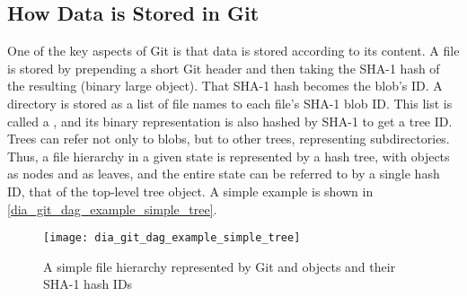





%

\subsection{How Data is Stored in Git}

One of the key aspects of Git is that data is stored according to its content. A
file is stored by prepending a short Git header and then taking the SHA-1 hash
of the resulting  (binary large object). That SHA-1 hash becomes
the blob's ID. A directory is stored as a list of file names to each file's
SHA-1 blob ID. This list is called a , and its binary
representation is also hashed by SHA-1 to get a tree ID. Trees can refer not
only to blobs, but to other trees, representing subdirectories. Thus, a file
hierarchy in a given state is represented by a hash tree, with 
objects as nodes and  as leaves, and the entire state can be
referred to by a single hash ID, that of the top-level tree object. A simple
example is shown in \autoref{dia_git_dag_example_simple_tree}.

\begin{figure}[h]
    \centering
    \texttt{[image: dia\_git\_dag\_example\_simple\_tree]}
    \caption{A simple file hierarchy represented by Git  and
         objects and their SHA-1 hash IDs}
    \label{dia_git_dag_example_simple_tree}
\end{figure}

